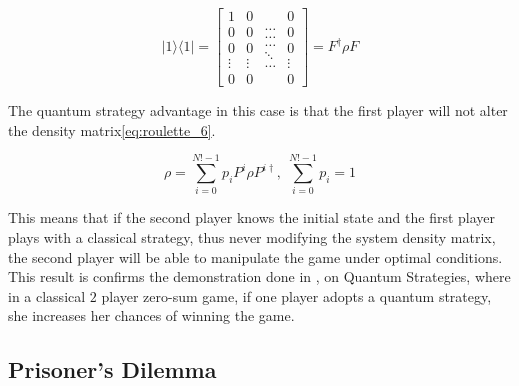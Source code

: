 \begin{equation}
\label{eq:roulette_5}
\vert1\rangle\langle1\vert=\left[\begin{array}{c}
1\\
0\\
0\\
\vdots\\
0
\end{array}\begin{array}{c}
0\\
0\\
0\\
\vdots\\
0
\end{array}\begin{array}{c}
\ldots\\
\ldots\\
\ldots\\
\ddots\\
\ldots
\end{array}\begin{array}{c}
0\\
0\\
0\\
\vdots\\
0
\end{array}\right]=F^{\dagger}\rho F
\end{equation}


The quantum strategy advantage in this case is that the first player
will not alter the density matrix\ref{eq:roulette_6}.

\begin{equation}
\label{eq:roulette_6}
\rho=\sum_{i=0}^{N!-1}p_{i}P^{i}\rho P^{i\dagger},\;\sum_{i=0}^{N!-1}p_{i}=1
\end{equation}

This means that if the second player knows the initial state and the first player plays with a classical strategy, thus never modifying the system density matrix, the second player will be able to manipulate the game under optimal conditions. This result is confirms the demonstration done in \cite{Meyer1999}, on Quantum Strategies, where in a classical $2$ player zero-sum game, if one player adopts a quantum strategy, she increases her chances of winning the game.


\subsection{Prisoner's Dilemma}
\label{sebsec:related_work_prisioners_dillama}

